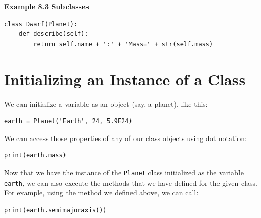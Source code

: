 \textbf{Example 8.3 Subclasses} %
\begin{lstlisting}
class Dwarf(Planet):
    def describe(self):
        return self.name + ':' + 'Mass=' + str(self.mass)
\end{lstlisting} %

\section{Initializing an Instance of a Class} %
We can initialize a variable as an object (say, a planet), like this: %

\begin{lstlisting}
earth = Planet('Earth', 24, 5.9E24)
\end{lstlisting} %

We can access those properties of any of our class objects using dot notation: %

\begin{lstlisting}
print(earth.mass)
\end{lstlisting} %

Now that we have the instance of the \texttt{Planet} class initialized as the variable \texttt{earth}, we can also execute the methods that we have defined for the given class. %
For example, using the method we defined above, we can call: %

\begin{lstlisting}
print(earth.semimajoraxis())
\end{lstlisting} %
